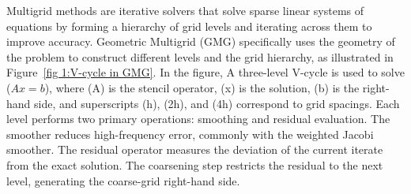 \documentclass[conference]{IEEEtran}
\begin{document}
            Multigrid methods are iterative solvers that solve sparse linear systems of equations by forming a hierarchy of grid levels and iterating across them to %
            improve accuracy.  %
            Geometric Multigrid (GMG) specifically uses the geometry of the problem to construct different levels and the grid hierarchy, as illustrated in Figure~\ref{fig 1:V-cycle in GMG}.
            In the figure,
            A three-level V-cycle is used to solve (\(Ax = b\)), where (A) is the stencil operator, (x) is the solution, (b) is the right-hand side, and superscripts (h), (2h), and (4h) correspond to grid spacings. Each level performs two primary operations: smoothing and residual evaluation. The smoother reduces high-frequency error, commonly with %
            the weighted Jacobi smoother. %
            The residual operator %
            measures the deviation of the current iterate from the exact solution. The coarsening step restricts the residual to the next level, generating the coarse-grid right-hand side. %
\end{document}
